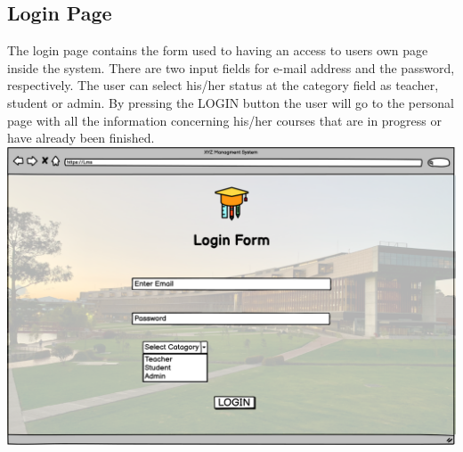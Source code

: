 \newpage
\subsection{Login Page}
  
The login page contains the form used to having an access to users own page inside the system. There are two input fields for e-mail address and the password, respectively. The user can select his/her status at the category field as teacher, student or admin. By pressing the LOGIN button the user will go to the personal page with all the information concerning his/her courses that are in progress or have already been finished.\\

\includegraphics[width=\columnwidth]{images/LoginForm.png}